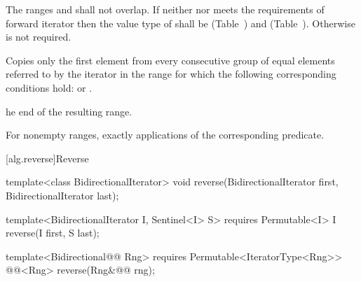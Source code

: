 \begin{itemdescr}
\pnum
\requires
{}
The ranges
and
shall not overlap. If neither
nor
meets the requirements of forward iterator then the value type of
shall be  (Table~) and
 (Table~).
Otherwise  is not required.

\pnum
\effects
Copies only the first element from every consecutive group of equal elements referred to by
the iterator
in the range
for which the following corresponding conditions hold:
or
.

\pnum
\returns
{}he end of the resulting range.

\pnum
\complexity
For nonempty ranges, exactly
applications of the corresponding predicate.
\end{itemdescr}

[alg.reverse]{Reverse}

%
\begin{removedblock}
\begin{itemdecl}
template<class BidirectionalIterator>
  void reverse(BidirectionalIterator first, BidirectionalIterator last);
\end{itemdecl}
\end{removedblock}
\begin{addedblock}
\begin{itemdecl}
template<BidirectionalIterator I, Sentinel<I> S>
  requires Permutable<I>
  I reverse(I first, S last);

template<Bidirectional@@ Rng>
  requires Permutable<IteratorType<Rng>>
  @@<Rng>
    reverse(Rng&@\newtxt{\&}@ rng);
\end{itemdecl}
\end{addedblock}

